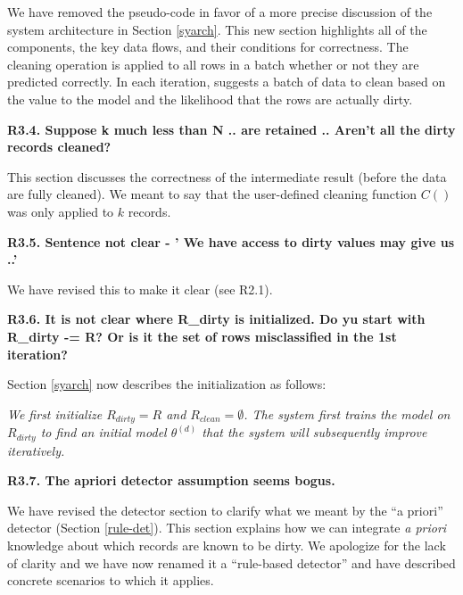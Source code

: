 \noindent  We have removed the pseudo-code in favor of a more precise discussion of the system architecture in Section \ref{syarch}. This new section highlights all of the components, the key data flows, and their conditions for correctness. 
The cleaning operation is applied to all rows in a batch whether or not they are predicted correctly.
In each iteration, \sys suggests a batch of data to clean based on the value to the model and the likelihood that the rows are actually dirty.

\vspace{0.5em}

\noindent \textbf{R3.4. Suppose k much less than N .. are retained .. Aren't all
the dirty records cleaned?}

\noindent This section discusses the correctness of the intermediate result (before the data are fully cleaned).
We meant to say that the user-defined cleaning function $C()$ was only applied to $k$ records.

\vspace{0.5em}

\noindent\textbf{R3.5. Sentence not clear - ' We have access to dirty
values may give us ..'}

 \noindent We have revised this to make it clear (see R2.1).

\vspace{0.5em}

\noindent\textbf{R3.6. It is not clear where R\_dirty is initialized. Do yu start with R\_dirty -= R? Or is it the set of rows misclassified in the 1st iteration?}

\noindent Section \ref{syarch} now describes the initialization as follows:

\emph{ We first initialize $R_{dirty} = R$ and $R_{clean} = \emptyset$.
The system first trains the model on $R_{dirty}$ to find an initial model $\theta^{(d)}$ that the system will subsequently improve iteratively.}

\vspace{0.5em}

\noindent\textbf{R3.7. The apriori detector assumption seems bogus.} 

\noindent  We have revised the detector section to clarify what we meant by the ``a priori'' detector (Section \ref{rule-det}). This section explains how we can integrate \emph{a priori} knowledge about which records are known to be dirty. We apologize for the lack of clarity and we have now renamed it a ``rule-based detector'' and have described concrete scenarios to which it applies. 

